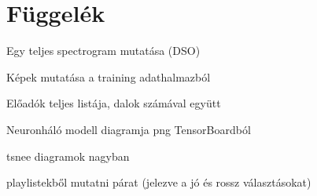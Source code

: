 \pagebreak
\pagestyle{semifancy}
\section{Függelék}

Egy teljes spectrogram mutatása (DSO)

\pagebreak
Képek mutatása a training adathalmazból

\pagebreak
Előadók teljes listája, dalok számával együtt

\pagebreak
Neuronháló modell diagramja png TensorBoardból

\pagebreak
tsnee diagramok nagyban

\pagebreak
playlistekből mutatni párat (jelezve a jó és rossz választásokat)
